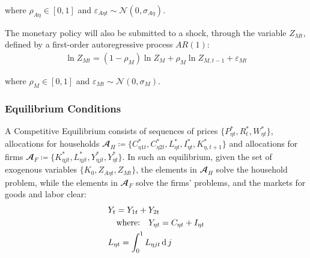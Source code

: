 \documentclass[../thesis.tex]{subfiles}
\begin{document}
where $\rho_{A\eta} \in [0,1]$ and $\varepsilon_{A\eta t} \sim \mathscr{N}(0,\sigma_{A\eta})$.


The monetary policy will also be submitted to a shock, through the variable $Z_{Mt}$, defined by a first-order autoregressive process $AR(1)$:
\begin{align}
	\ln{Z_{Mt}} = (1-\rho_M)\ln{Z_{M}} + \rho_M\ln{Z_{M,t-1}} + \varepsilon_{Mt} \label{eq_v2:reg-monetary-shock}
\end{align}

where $\rho_M \in [0,1]$ and $\varepsilon_{Mt} \sim \mathscr{N}(0,\sigma_M)$.


\subsubsection{Equilibrium Conditions}


	A Competitive Equilibrium consists of sequences of prices $\{P_{\eta t}^{\ast}, R_t^{\ast}, W_{\eta t}^{\ast}\}$, allocations for households $\mathbfscr{A}_H \coloneq \{C_{\eta 1 t}^{\ast}, C_{\eta 2 t}^{\ast}, L_{\eta t}^{\ast}, I_{\eta t}^{\ast}, K_{\eta, t+1}^{\ast}\}$ and allocations  for firms $\mathbfscr{A}_F \coloneq \{K_{\eta jt}^{\ast}, L_{\eta jt}^{\ast}, Y_{\eta jt}^{\ast}, Y_{\eta t}^{\ast}\}$. In such an equilibrium, given the set of exogenous variables $\{K_0, Z_{A\eta t}, Z_{Mt}\}$, the elements in $\mathbfscr{A}_H$ solve the household problem, while the elements in $\mathbfscr{A}_F$ solve the firms' problems, and the markets for goods and labor clear: %
	\begin{align}
		& Y_{t} = Y_{1 t} + Y_{2 t} \label{eq_v2:reg-market-clearing-condition-Yt} \\
		& \quad \text{where:} \quad Y_{\eta t} = C_{\eta t} + I_{\eta t} \label{eq_v2:reg-regional-demand} \\
		& L_{\eta t} = \int_{0}^{1} L_{\eta jt} \operatorname{d} j \label{eq_v2:reg-market-clearing-condition-Lt} 
	\end{align}
	
\end{document}
